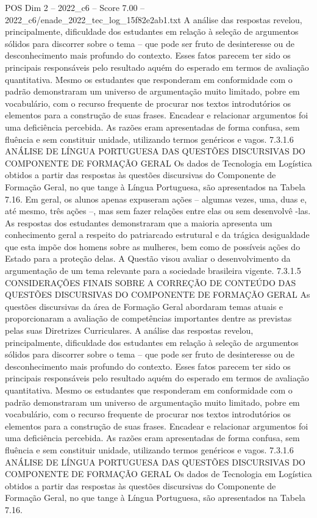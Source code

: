 \begin{textsample}{POS Dim 2 – 2022\_c6 – Score 7.00 – 2022\_c6/enade\_2022\_tec\_log\_15f82e2ab1.txt}
A análise das respostas revelou, principalmente, dificuldade dos estudantes em relação à seleção de argumentos sólidos para discorrer sobre o tema – que pode ser fruto de desinteresse ou de desconhecimento mais profundo do contexto.
Esses fatos parecem ter sido os principais responsáveis pelo resultado aquém do esperado em termos de avaliação quantitativa.
Mesmo os estudantes que responderam em conformidade com o padrão demonstraram um universo de argumentação muito limitado, pobre em vocabulário, com o recurso frequente de procurar nos textos introdutórios os elementos para a construção de suas frases.
Encadear e relacionar argumentos foi uma deficiência percebida.
As razões eram apresentadas de forma confusa, sem fluência e sem constituir unidade, utilizando termos genéricos e vagos. 7.3.1.6 ANÁLISE DE LÍNGUA PORTUGUESA DAS QUESTÕES DISCURSIVAS DO COMPONENTE DE FORMAÇÃO GERAL Os dados de Tecnologia em Logística obtidos a partir das respostas às questões discursivas do Componente de Formação Geral, no que tange à Língua Portuguesa, são apresentados na Tabela 7.16.
Em geral, os alunos apenas expuseram ações – algumas vezes, uma, duas e, até mesmo, três ações –, mas sem fazer relações entre elas ou sem desenvolvê -las.
As respostas dos estudantes demonstraram que a maioria apresenta um conhecimento geral a respeito do patriarcado estrutural e da trágica desigualdade que esta impõe dos homens sobre as mulheres, bem como de possíveis ações do Estado para a proteção delas.
A Questão visou avaliar o desenvolvimento da argumentação de um tema relevante para a sociedade brasileira vigente. 7.3.1.5 CONSIDERAÇÕES FINAIS SOBRE A CORREÇÃO DE CONTEÚDO DAS QUESTÕES DISCURSIVAS DO COMPONENTE DE FORMAÇÃO GERAL As questões discursivas da área de Formação Geral abordaram temas atuais e proporcionaram a avaliação de competências importantes dentre as previstas pelas suas Diretrizes Curriculares.
A análise das respostas revelou, principalmente, dificuldade dos estudantes em relação à seleção de argumentos sólidos para discorrer sobre o tema – que pode ser fruto de desinteresse ou de desconhecimento mais profundo do contexto.
Esses fatos parecem ter sido os principais responsáveis pelo resultado aquém do esperado em termos de avaliação quantitativa.
Mesmo os estudantes que responderam em conformidade com o padrão demonstraram um universo de argumentação muito limitado, pobre em vocabulário, com o recurso frequente de procurar nos textos introdutórios os elementos para a construção de suas frases.
Encadear e relacionar argumentos foi uma deficiência percebida.
As razões eram apresentadas de forma confusa, sem fluência e sem constituir unidade, utilizando termos genéricos e vagos. 7.3.1.6 ANÁLISE DE LÍNGUA PORTUGUESA DAS QUESTÕES DISCURSIVAS DO COMPONENTE DE FORMAÇÃO GERAL Os dados de Tecnologia em Logística obtidos a partir das respostas às questões discursivas do Componente de Formação Geral, no que tange à Língua Portuguesa, são apresentados na Tabela 7.16.

\end{textsample}

